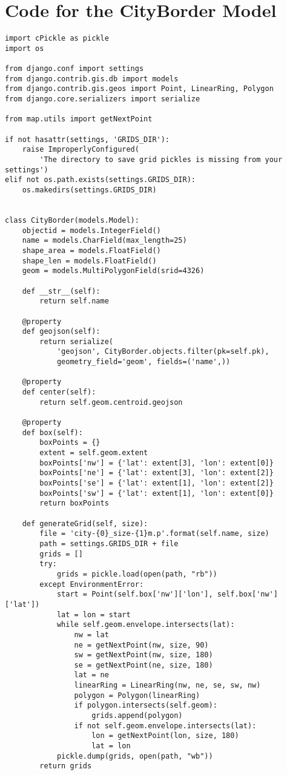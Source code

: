 \chapter{Code for the CityBorder Model} \label{code-cityborder}
\begin{small}
\begin{verbatim}
import cPickle as pickle
import os

from django.conf import settings
from django.contrib.gis.db import models
from django.contrib.gis.geos import Point, LinearRing, Polygon
from django.core.serializers import serialize

from map.utils import getNextPoint

if not hasattr(settings, 'GRIDS_DIR'):
    raise ImproperlyConfigured(
        'The directory to save grid pickles is missing from your settings')
elif not os.path.exists(settings.GRIDS_DIR):
    os.makedirs(settings.GRIDS_DIR)


class CityBorder(models.Model):
    objectid = models.IntegerField()
    name = models.CharField(max_length=25)
    shape_area = models.FloatField()
    shape_len = models.FloatField()
    geom = models.MultiPolygonField(srid=4326)

    def __str__(self):
        return self.name

    @property
    def geojson(self):
        return serialize(
            'geojson', CityBorder.objects.filter(pk=self.pk),
            geometry_field='geom', fields=('name',))

    @property
    def center(self):
        return self.geom.centroid.geojson

    @property
    def box(self):
        boxPoints = {}
        extent = self.geom.extent
        boxPoints['nw'] = {'lat': extent[3], 'lon': extent[0]}
        boxPoints['ne'] = {'lat': extent[3], 'lon': extent[2]}
        boxPoints['se'] = {'lat': extent[1], 'lon': extent[2]}
        boxPoints['sw'] = {'lat': extent[1], 'lon': extent[0]}
        return boxPoints

    def generateGrid(self, size):
        file = 'city-{0}_size-{1}m.p'.format(self.name, size)
        path = settings.GRIDS_DIR + file
        grids = []
        try:
            grids = pickle.load(open(path, "rb"))
        except EnvironmentError:
            start = Point(self.box['nw']['lon'], self.box['nw']['lat'])
            lat = lon = start
            while self.geom.envelope.intersects(lat):
                nw = lat
                ne = getNextPoint(nw, size, 90)
                sw = getNextPoint(nw, size, 180)
                se = getNextPoint(ne, size, 180)
                lat = ne
                linearRing = LinearRing(nw, ne, se, sw, nw)
                polygon = Polygon(linearRing)
                if polygon.intersects(self.geom):
                    grids.append(polygon)
                if not self.geom.envelope.intersects(lat):
                    lon = getNextPoint(lon, size, 180)
                    lat = lon
            pickle.dump(grids, open(path, "wb"))
        return grids

\end{verbatim}
\end{small}